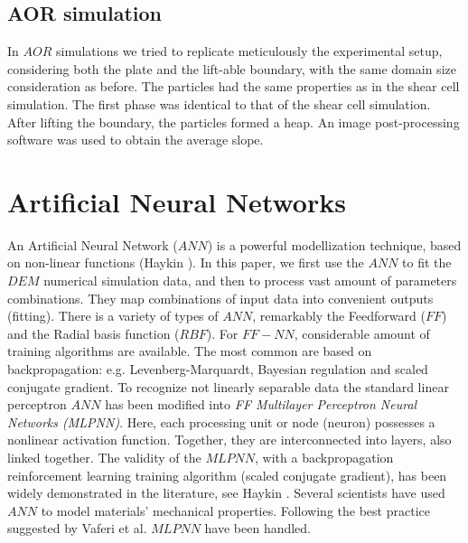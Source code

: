 \begin{appendix}
\subsection{AOR simulation}
\label{subsec:aorsimulation}
In $AOR$ simulations we tried to replicate meticulously the experimental setup, 
considering both the plate and the lift-able boundary, with the same domain size consideration as before. 
The particles had the same properties as in the shear cell simulation. The first phase was identical to that of the shear cell simulation. 
After lifting the boundary, the particles formed a heap.
An image post-processing software was used to obtain the average slope.



\section{Artificial Neural Networks}
\label{sec:appann}

An Artificial Neural Network ($ANN$) is a powerful modellization technique, 
based on non-linear functions (Haykin \cite{RefWorks:158}). 
In this paper, we first use the $ANN$ to fit the $DEM$ numerical simulation data, 
and then to process vast amount of parameters combinations. 
They map combinations of input data into convenient outputs (fitting). 
There is a variety of types of $ANN$, remarkably the Feedforward ($FF$) 
and the Radial basis function ($RBF$). For $FF-NN$, considerable amount 
of training algorithms are available. The most common are based on
backpropagation:
e.g. Levenberg-Marquardt, Bayesian regulation and scaled conjugate gradient. 
To recognize not linearly separable data the standard linear perceptron $ANN$ 
has been modified into \textit{FF Multilayer Perceptron Neural Networks (MLPNN)}. 
Here, each processing unit or node (neuron) possesses a nonlinear activation function. 
Together, they are interconnected into layers, also linked together. 
The validity of the $MLPNN$, with a backpropagation reinforcement learning 
training algorithm (scaled conjugate gradient), has been widely demonstrated in the 
literature, see Haykin \cite{RefWorks:158}. Several scientists 
\cite{RefWorks:161, RefWorks:166, RefWorks:167, RefWorks:168, RefWorks:169,
RefWorks:170, RefWorks:178, RefWorks:179} have used $ANN$ to model materials'
mechanical properties.
Following the best practice suggested by Vaferi et al. \cite{RefWorks:150} $MLPNN$ have been handled.


\end{appendix}
